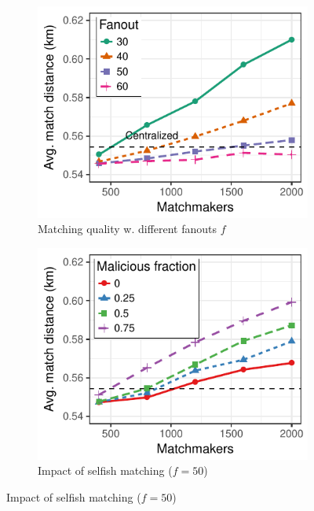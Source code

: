\begin{figure}[t]
	\centering
	\begin{subfigure}{.5\columnwidth}
		\centering
		\includegraphics[width=\linewidth]{match/assets/plots/taxi_quality.pdf}
		\caption{Matching quality w. different fanouts $ f $}
		\label{fig:taxi_quality}
	\end{subfigure}%
	\begin{subfigure}{.5\columnwidth}
		\centering
		\includegraphics[width=\columnwidth]{match/assets/plots/taxi_fairness_fixed.pdf}
		\caption{Impact of selfish matching ($ f = 50 $)}
		\label{fig:taxi_fairness_fixed}
	\end{subfigure}\vspace{0.3cm}

\end{figure}

